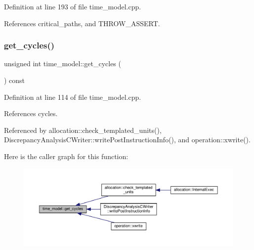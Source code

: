 Definition at line 193 of file time\+\_\+model.\+cpp.



References critical\+\_\+paths, and T\+H\+R\+O\+W\+\_\+\+A\+S\+S\+E\+RT.

\mbox{\label{classtime__model_af230e6b138686c1a759bdaeae3efeec8}} 
\subsubsection{\texorpdfstring{get\+\_\+cycles()}{get\_cycles()}}
{\footnotesize\ttfamily unsigned int time\+\_\+model\+::get\+\_\+cycles (\begin{DoxyParamCaption}{ }\end{DoxyParamCaption}) const}



Definition at line 114 of file time\+\_\+model.\+cpp.



References cycles.



Referenced by allocation\+::check\+\_\+templated\+\_\+units(), Discrepancy\+Analysis\+C\+Writer\+::write\+Post\+Instruction\+Info(), and operation\+::xwrite().

Here is the caller graph for this function\+:
\nopagebreak
\begin{figure}[H]
\begin{center}
\leavevmode
\includegraphics[width=350pt]{d3/d73/classtime__model_af230e6b138686c1a759bdaeae3efeec8_icgraph}
\end{center}
\end{figure}
\mbox{\label{classtime__model_ab4f348d14a35c9ff8f35a6f5d65aa04c}} 
